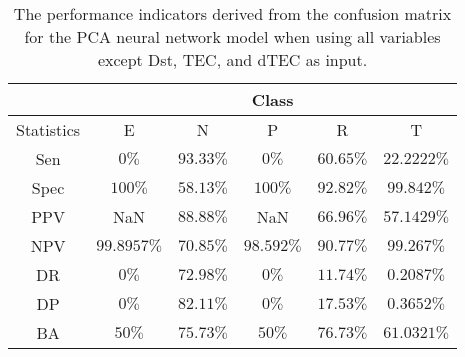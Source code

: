 \begin{table}[!ht]
	\centering
	\begin{tabular}{|c|c|c|c|c|c|}
		\hline
		 & \multicolumn{5}{c|}{Class} \\ \hline
		Statistics & E & N & P & R & T \\ \hline
		Sen & $0\%$ & $93.33\%$ & $0\%$ & $60.65\%$ & $22.2222\%$ \\ \hline
		Spec & $100\%$ & $58.13\%$ & $100\%$ & $92.82\%$ & $99.842\%$ \\ \hline
		PPV & NaN & $88.88\%$ & NaN & $66.96\%$ & $57.1429\%$ \\ \hline
		NPV & $99.8957\%$ & $70.85\%$ & $98.592\%$ & $90.77\%$ & $99.267\%$ \\ \hline
		DR & $0\%$ & $72.98\%$ & $0\%$ & $11.74\%$ & $0.2087\%$ \\ \hline
		DP & $0\%$ & $82.11\%$ & $0\%$ & $17.53\%$ & $0.3652\%$ \\ \hline
		BA & $50\%$ & $75.73\%$ & $50\%$ & $76.73\%$ & $61.0321\%$ \\ \hline
	\end{tabular}
	\caption{The performance indicators derived from the confusion matrix for the PCA neural network model when using all variables except Dst, TEC, and dTEC as input.}
	\label{tab:cs:reverse:noTEC:pcaNNet}
\end{table}
